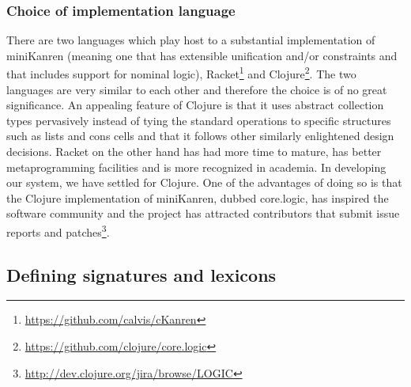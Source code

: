 \subsubsection{Choice of implementation language}

There are two languages which play host to a substantial implementation
of miniKanren (meaning one that has extensible unification and/or
constraints and that includes support for nominal logic),
Racket\footnote{\url{https://github.com/calvis/cKanren}} and
Clojure\footnote{\url{https://github.com/clojure/core.logic}}. The two
languages are very similar to each other and therefore the choice is of
no great significance. An appealing feature of Clojure is that it uses
abstract collection types pervasively instead of tying the standard
operations to specific structures such as lists and cons cells and that
it follows other similarly enlightened design decisions. Racket on the
other hand has had more time to mature, has better metaprogramming
facilities and is more recognized in academia. In developing our system,
we have settled for Clojure. One of the advantages of doing so is that
the Clojure implementation of miniKanren, dubbed core.logic, has
inspired the software community and the project has attracted
contributors that submit issue reports and
patches\footnote{\url{http://dev.clojure.org/jira/browse/LOGIC}}.


\subsection{Defining signatures and lexicons}
